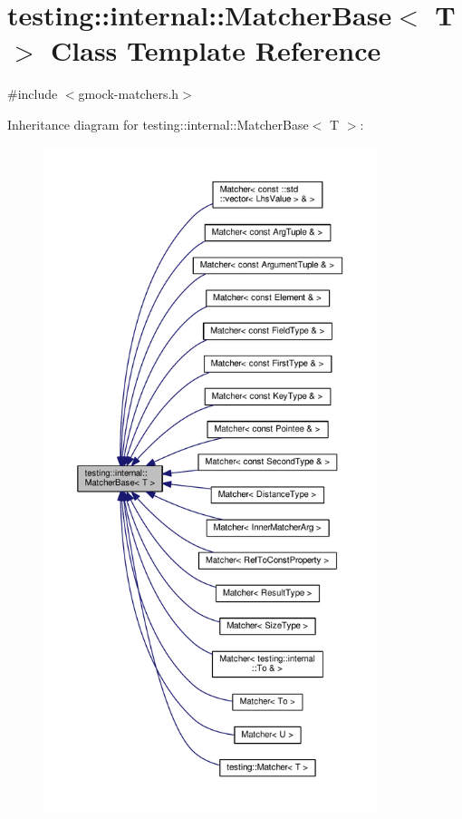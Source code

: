 \hypertarget{classtesting_1_1internal_1_1MatcherBase}{}\section{testing\+:\+:internal\+:\+:Matcher\+Base$<$ T $>$ Class Template Reference}
\label{classtesting_1_1internal_1_1MatcherBase}


{\ttfamily \#include $<$gmock-\/matchers.\+h$>$}



Inheritance diagram for testing\+:\+:internal\+:\+:Matcher\+Base$<$ T $>$\+:
\nopagebreak
\begin{figure}[H]
\begin{center}
\leavevmode
\includegraphics[height=550pt]{classtesting_1_1internal_1_1MatcherBase__inherit__graph}
\end{center}
\end{figure}
